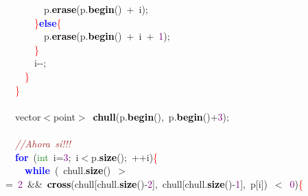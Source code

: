 {{\mbox{}\ \ \ \ \ \ \ \ p\textcolor{BrickRed}{.}\textbf{\textcolor{Black}{erase}}\textcolor{BrickRed}{(}p\textcolor{BrickRed}{.}\textbf{\textcolor{Black}{begin}}\textcolor{BrickRed}{()}\ \textcolor{BrickRed}{+}\ i\textcolor{BrickRed}{);} \\
\mbox{}\ \ \ \ \ \ \textcolor{Red}{\}}\textbf{\textcolor{Blue}{else}}\textcolor{Red}{\{} \\
\mbox{}\ \ \ \ \ \ \ \ p\textcolor{BrickRed}{.}\textbf{\textcolor{Black}{erase}}\textcolor{BrickRed}{(}p\textcolor{BrickRed}{.}\textbf{\textcolor{Black}{begin}}\textcolor{BrickRed}{()}\ \textcolor{BrickRed}{+}\ i\ \textcolor{BrickRed}{+}\ \textcolor{Purple}{1}\textcolor{BrickRed}{);} \\
\mbox{}\ \ \ \ \ \ \textcolor{Red}{\}} \\
\mbox{}\ \ \ \ \ \ i\textcolor{BrickRed}{-\/-;} \\
\mbox{}\ \ \ \ \textcolor{Red}{\}} \\
\mbox{}\ \ \textcolor{Red}{\}} \\
\mbox{}\ \  \\
\mbox{}\ \ vector\textcolor{BrickRed}{$<$}point\textcolor{BrickRed}{$>$}\ \textbf{\textcolor{Black}{chull}}\textcolor{BrickRed}{(}p\textcolor{BrickRed}{.}\textbf{\textcolor{Black}{begin}}\textcolor{BrickRed}{(),}\ p\textcolor{BrickRed}{.}\textbf{\textcolor{Black}{begin}}\textcolor{BrickRed}{()+}\textcolor{Purple}{3}\textcolor{BrickRed}{);} \\
\mbox{} \\
\mbox{}\ \ \textit{\textcolor{Brown}{//Ahora\ sí!!!}} \\
\mbox{}\ \ \textbf{\textcolor{Blue}{for}}\ \textcolor{BrickRed}{(}\textcolor{ForestGreen}{int}\ i\textcolor{BrickRed}{=}\textcolor{Purple}{3}\textcolor{BrickRed}{;}\ i\textcolor{BrickRed}{$<$}p\textcolor{BrickRed}{.}\textbf{\textcolor{Black}{size}}\textcolor{BrickRed}{();}\ \textcolor{BrickRed}{++}i\textcolor{BrickRed}{)}\textcolor{Red}{\{} \\
\mbox{}\ \ \ \ \textbf{\textcolor{Blue}{while}}\ \textcolor{BrickRed}{(}\ chull\textcolor{BrickRed}{.}\textbf{\textcolor{Black}{size}}\textcolor{BrickRed}{()}\ \textcolor{BrickRed}{$>$=}\ \textcolor{Purple}{2}\ \textcolor{BrickRed}{\&\&}\ \textbf{\textcolor{Black}{cross}}\textcolor{BrickRed}{(}chull\textcolor{BrickRed}{[}chull\textcolor{BrickRed}{.}\textbf{\textcolor{Black}{size}}\textcolor{BrickRed}{()-}\textcolor{Purple}{2}\textcolor{BrickRed}{],}\ chull\textcolor{BrickRed}{[}chull\textcolor{BrickRed}{.}\textbf{\textcolor{Black}{size}}\textcolor{BrickRed}{()-}\textcolor{Purple}{1}\textcolor{BrickRed}{],}\ p\textcolor{BrickRed}{[}i\textcolor{BrickRed}{])}\ \textcolor{BrickRed}{$<$}\ \textcolor{Purple}{0}\textcolor{BrickRed}{)}\textcolor{Red}{\{} \\
}}
